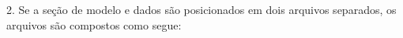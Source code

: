 \documentclass[11pt, brazil]{report}
\begin{document}
%
%
%
%
%
%
%


\newpage

2. Se a seção de modelo e dados são posicionados em dois arquivos separados, os
arquivos são compostos como segue:

\bigskip
\end{document}
